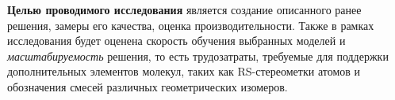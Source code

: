 \textbf{Целью проводимого исследования} является создание описанного ранее решения, замеры его качества, оценка производительности. Также в рамках исследования будет оценена скорость обучения выбранных моделей и \textit{масштабируемость} решения, то есть трудозатраты, требуемые для поддержки дополнительных элементов молекул, таких как RS-стереометки атомов и обозначения смесей различных геометрических изомеров.




